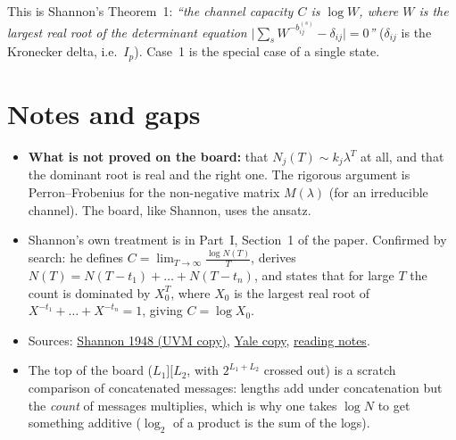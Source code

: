 \documentclass[11pt]{article}
\begin{document}
This is Shannon's Theorem~1: \emph{``the channel capacity $C$ is $\log W$, where $W$ is the largest real root of the determinant equation $\bigl|\sum_sW^{-b_{ij}^{(s)}}-\delta_{ij}\bigr|=0$''} ($\delta_{ij}$ is the Kronecker delta, i.e.\ $I_p$). Case~1 is the special case of a single state.

\section*{Notes and gaps}
\begin{itemize}
  \item \textbf{What is not proved on the board:} that $N_j(T)\sim k_j\lambda^T$ at all, and that the dominant root is real and the right one. The rigorous argument is Perron--Frobenius for the non-negative matrix $M(\lambda)$ (for an irreducible channel). The board, like Shannon, uses the ansatz.
  \item Shannon's own treatment is in Part~I, Section~1 of the paper. Confirmed by search: he defines $C=\lim_{T\to\infty}\frac{\log N(T)}T$, derives $N(T)=N(T-t_1)+\dots+N(T-t_n)$, and states that for large $T$ the count is dominated by $X_0^T$, where $X_0$ is the largest real root of $X^{-t_1}+\dots+X^{-t_n}=1$, giving $C=\log X_0$.
  \item Sources: \href{https://www.uvm.edu/~cvincen1/files/teaching/spring2018-math382/shannon.pdf}{Shannon 1948 (UVM copy)}, \href{https://www.cs.yale.edu/homes/yry/readings/general/shannon1948.pdf}{Yale copy}, \href{https://vvkahpm.github.io/notes/Information\%20Theory/Reading_Shannon_1948/}{reading notes}.
  \item The top of the board ($L_1][L_2$, with $2^{L_1+L_2}$ crossed out) is a scratch comparison of concatenated messages: lengths add under concatenation but the \emph{count} of messages multiplies, which is why one takes $\log N$ to get something additive ($\log_2$ of a product is the sum of the logs).
\end{itemize}
\end{document}
